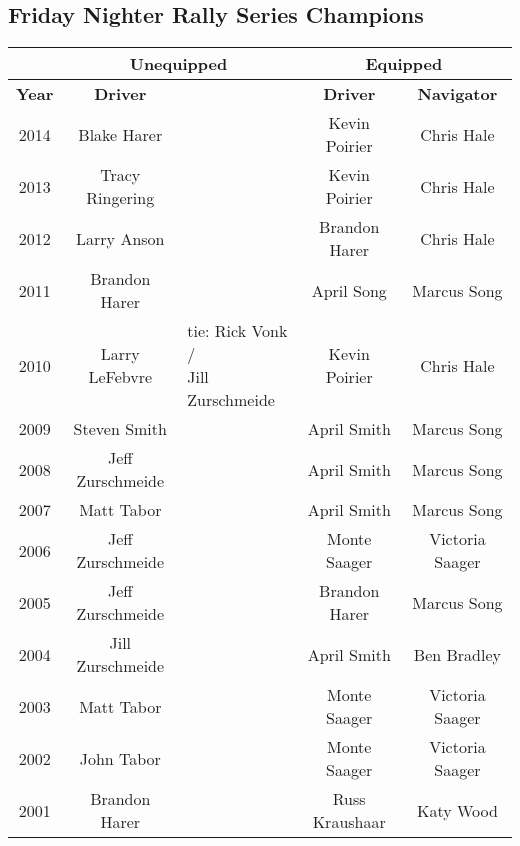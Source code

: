 \subsection{Friday Nighter Rally Series Champions}
{
\scriptsize
\begin{tabular}{|c|c|p{3cm}|c|c|}
\hline
 & \multicolumn{2}{|c|}{Unequipped} & \multicolumn{2}{|c|}{Equipped} \\
\hline
\textbf{Year} & \textbf{Driver} & \centering{\textbf{Navigator}} & \textbf{Driver} & \textbf{Navigator} \\
\hline
2014 & Blake Harer & \centering{Brandon Harer} & Kevin Poirier & Chris Hale \\
\hline
2013 & Tracy Ringering & \centering{Simon Levear} & Kevin Poirier & Chris Hale \\
\hline
2012 & Larry Anson & \centering{Fran Hanchek} & Brandon Harer & Chris Hale \\
\hline
2011 & Brandon Harer & \centering{Marcus Gattman} & April Song & Marcus Song \\
\hline
2010 & Larry LeFebvre & \centering{tie: Rick Vonk /\newline Jill Zurschmeide} & Kevin Poirier & Chris Hale \\
\hline
2009 & Steven Smith & \centering{John Masterman} & April Smith & Marcus Song \\
\hline
2008 & Jeff Zurschmeide & \centering{Jill Zurschmeide} & April Smith & Marcus Song \\
\hline
2007 & Matt Tabor & \centering{Marcus Gattman} & April Smith & Marcus Song \\
\hline
2006 & Jeff Zurschmeide & \centering{Jill Zurschmeide} & Monte Saager & Victoria Saager \\
\hline
2005 & Jeff Zurschmeide & \centering{Jill Zurschmeide} & Brandon Harer & Marcus Song \\
\hline
2004 & Jill Zurschmeide & \centering{Jeff Zurschmeide} & April Smith & Ben Bradley \\
\hline
2003 & Matt Tabor & \centering{Marcus Gattman} & Monte Saager & Victoria Saager \\
\hline
2002 & John Tabor & \centering{Darlene Tabor} & Monte Saager & Victoria Saager \\
\hline
2001 & Brandon Harer & \centering{Jennifer McGrew} & Russ Kraushaar & Katy Wood \\
\hline
\end{tabular}
}
